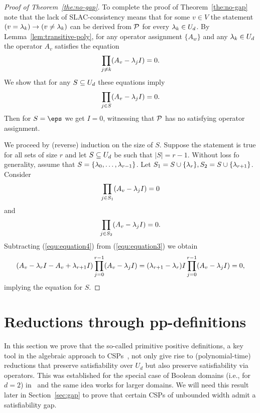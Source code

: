 \documentclass[11pt,letter]{article}
\begin{document}
\begin{proof}[Proof of Theorem~\ref{the:no-gap}]
To complete the proof of Theorem~\ref{the:no-gap} note that the lack of
SLAC-consistency means that for some $v\in V$ the statement 
$(v=\lambda_k)\to(v\ne\lambda_k)$ can be derived from ${\mathcal P}$ for every $\lambda_k\in U_d$.
By Lemma~\ref{lem:transitive-poly}, for any operator assignment $\{A_w\}$
and any $\lambda_k\in U_d$ the operator $A_v$ satisfies the equation
\[
\prod_{j\ne k}(A_v-\lambda_jI)=0.
\]
We show that for any $S\subseteq U_d$ these equations imply 
\[
\prod_{j\in S}(A_v-\lambda_jI)=0.
\]
Then for $S=\eps$ we get $I=0$, witnessing that ${\mathcal P}$ has no satisfying 
operator assignment.

We proceed by (reverse) induction on the size of $S$. Suppose the statement is true 
for all sets of size $r$ and let $S\subseteq U_d$ be such that $|S|=r-1$. Without loss fo
generality, assume that
$S=\{\lambda_0,\ldots,\lambda_{r-1}\}$. Let $S_1=S\cup\{\lambda_r\}, S_2=S\cup\{\lambda_{r+1}\}$.
Consider
\begin{equation}\label{equ:equation3}
\prod_{j\in S_1}(A_v-\lambda_jI)=0
\end{equation}
and
\begin{equation}\label{equ:equation4}
\prod_{j\in S_2}(A_v-\lambda_jI)=0.
\end{equation}
Subtracting (\ref{equ:equation4}) from (\ref{equ:equation3}) we obtain
\[
(A_v-\lambda_rI-A_v+\lambda_{r+1}I)\prod_{j=0}^{r-1}(A_v-\lambda_jI)=
(\lambda_{r+1}-\lambda_r)I\prod_{j=0}^{r-1}(A_v-\lambda_jI)=0,
\]
implying the equation for $S$.
\end{proof}
 
\section{Reductions through pp-definitions}\label{sec:operator-pp}

In this section we prove that the so-called primitive positive definitions, a key tool in the
algebraic approach to CSPs~\cite{Bulatov05:classifying}, not only give rise to
(polynomial-time) reductions that preserve satisfiability over $U_d$ but also
preserve satisfiability via operators. This was
established for the special case of Boolean domains (i.e., for $d=2$)
in~\cite{AKS19:jcss} and the same idea works for larger domains. We will need
this result later in Section~\ref{sec:gap} to prove that certain CSPs of 
unbounded width admit a satisfiability gap.
\end{document}
